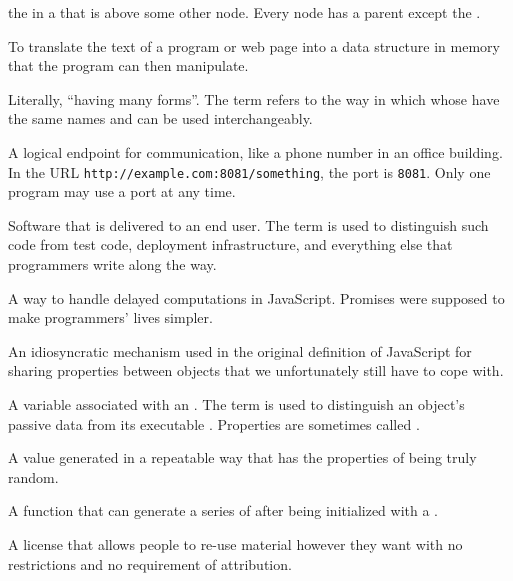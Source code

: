 \begin{description}
the  in a  that is above some other node. Every
node has a parent except the .

To translate the text of a program or web page into a data structure in memory
that the program can then manipulate.

Literally, ``having many forms''. The term refers to the way in which
 whose  have the same names and
 can be used interchangeably.

A logical endpoint for communication, like a phone number in an office
building. In the URL \texttt{http://example.com:8081/something}, the port is \texttt{8081}.
Only one program may use a port at any time.

Software that is delivered to an end user. The term is used to distinguish
such code from test code, deployment infrastructure, and everything else that
programmers write along the way.

A way to handle delayed computations in JavaScript. Promises were supposed to
make programmers' lives simpler.

An idiosyncratic mechanism used in the original definition of JavaScript for
sharing properties between objects that we unfortunately still have to cope
with.

A variable associated with an . The term is used to
distinguish an object's passive data from its executable .
Properties are sometimes called .

A value generated in a repeatable way that has the properties of being truly
random.

A function that can generate a series of  after being initialized with a
.

A license that allows people to re-use material however they want
with no restrictions and no requirement of attribution.


\end{description}
